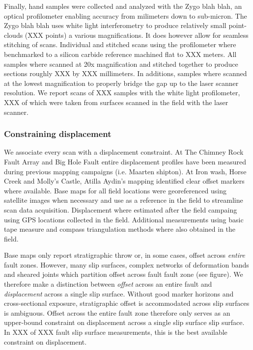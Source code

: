 \documentclass[12pt,a4paper]{article}
\begin{document}
Finally, hand samples were collected and analyzed with the Zygo blah blah, an optical profilometer enabling accuracy from milimeters down to sub-micron. The Zygo blah blah uses white light interferometry to produce relatively small point-clouds (XXX points) a various magnifications. It does however allow for seamless stitching of scans. Individual and stitched scans using the profilometer where benchmarked to a silicon carbide reference machined flat to XXX meters. All samples where scanned at 20x magnification and stitched together to produce sections roughly XXX by XXX millimeters. In additions, samples where scanned at the lowest magnification to properly bridge the gap up to the laser scanner resolution. We report scans of XXX samples with the white light profilometer, XXX of which were taken from surfaces scanned in the field with the laser scanner.

	\subsubsection{Constraining displacement}

We associate every scan with a displacement constraint. At The Chimney Rock Fault Array and Big Hole Fault entire displacement profiles have been measured during previous mapping campaigns (i.e. Maarten  shipton).  At Iron wash, Horse Creek and Molly’s Castle, Atilla Aydin’s mapping identified clear offset markers where available. Base maps for all field locations were georeferenced using satellite images when necessary and use as a reference in the field to streamline scan data acquisition. Displacement where estimated after the field campaing using GPS locations collected in the field. Additional measurements using basic tape measure and compass triangulation methods where also obtained in the field.  

Base maps only report stratigraphic throw or, in some cases, offset across \textit{entire} fault zones. However, many slip surfaces, complex networks of deformation bands and sheared joints which partition offset across fault fault zone (see figure). We therefore make a distinction between \textit{offset} across an entire fault and \textit{displacement} across a single slip surface. Without good marker horizons and cross-sectional exposure, stratigraphic offset is accommodated across slip surfaces is ambiguous. Offset across the entire fault zone therefore only serves as an upper-bound constraint on displacement across a single slip surface slip surface. In XXX of XXX fault slip surface measurements, this is the best available constraint on displacement. 
\end{document}
